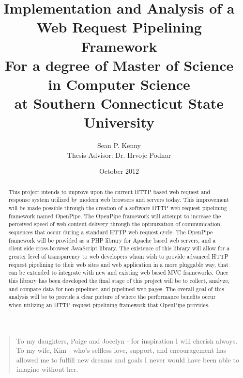 \documentclass[12pt]{report}
\newenvironment{dedication}
	{\vspace{6ex}\begin{quotation}\begin{center}\begin{em}}
	{\par\end{em}\end{center}\end{quotation}}
\begin{document}

\title{
	Implementation and Analysis of a Web Request Pipelining Framework \\ 
	\footnotesize{
		For a degree of Master of Science in Computer Science \\ 
	 	at Southern Connecticut State University
	}
}
\date{October 2012}
\author{
	Sean P. Kenny \\ 
	Thesis Advisor: Dr. Hrvoje Podnar
}

\maketitle

\newpage
\setcounter{page}{2}
\thispagestyle{plain}
\mbox{}

\begin{abstract}
\thispagestyle{plain}
\setcounter{page}{3}
This project intends to improve upon the current HTTP based web request and response system utilized by modern web browsers and servers today. This improvement will be made possible through the creation of a software HTTP web request pipelining framework named OpenPipe. The OpenPipe framework will attempt to increase the perceived speed of web content delivery through the optimization of communication sequences that occur during a standard HTTP web request cycle. The OpenPipe framework will be provided as a PHP library for Apache based web servers, and a client side cross-browser JavaScript library. The existence of this library will allow for a greater level of transparency to web developers whom wish to provide advanced HTTP request pipelining  to their web sites and web application in a more pluggable way, that can be extended to integrate with new and existing web based MVC frameworks. Once this library has been developed the final stage of this project will be to collect, analyze, and compare data for non-pipelined and pipelined web pages. The overall goal of this analysis will be to provide a clear picture of where the performance benefits occur when utilizing an HTTP request pipelining framework that OpenPipe provides.
\end{abstract}

\begin{dedication}
\setcounter{page}{4}
To my daughters, Paige and Jocelyn - for inspiration I will cherish always.
\linebreak\linebreak
To my wife, Kim - who’s selfless love, support, and encouragement has allowed me to fulfill new dreams and goals I never would have been able to imagine without her.
\end{dedication}
\end{document}
